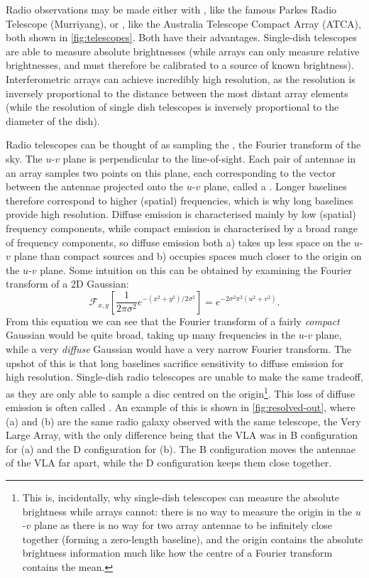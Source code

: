         Radio observations may be made either with , like the famous Parkes Radio Telescope (Murriyang), or , like the Australia Telescope Compact Array (ATCA), both shown in \autoref{fig:telescopes}. Both have their advantages. Single-dish telescopes are able to measure absolute brightnesses (while arrays can only measure relative brightnesses, and must therefore be calibrated to a source of known brightness). Interferometric arrays can achieve incredibly high resolution, as the resolution is inversely proportional to the distance between the most distant array elements (while the resolution of single dish telescopes is inversely proportional to the diameter of the dish).

        Radio telescopes can be thought of as sampling the , the Fourier transform of the sky. The $u$-$v$ plane is perpendicular to the line-of-sight. Each pair of antennae in an array samples two points on this plane, each corresponding to the vector between the antennae projected onto the $u$-$v$ plane, called a . Longer baselines therefore correspond to higher (spatial) frequencies, which is why long baselines provide high resolution. Diffuse emission is characterised mainly by low (spatial) frequency components, while compact emission is characterised by a broad range of frequency components, so diffuse emission both a) takes up less space on the $u$-$v$ plane than compact sources and b) occupies spaces much closer to the origin on the $u$-$v$ plane. Some intuition on this can be obtained by examining the Fourier transform of a 2D Gaussian:
        \begin{equation}
            \mathcal F_{x, y}\left[\frac{1}{2\pi\sigma^2} e^{-(x^2 + y^2) / 2\sigma^2}\right] = e^{-2\sigma^2 \pi^2(u^2 + v^2)}.
        \end{equation}
        From this equation we can see that the Fourier transform of a fairly \emph{compact} Gaussian would be quite broad, taking up many frequencies in the $u$-$v$ plane, while a very \emph{diffuse} Gaussian would have a very narrow Fourier transform. The upshot of this is that long baselines sacrifice sensitivity to diffuse emission for high resolution. Single-dish radio telescopes are unable to make the same tradeoff, as they are only able to sample a disc centred on the origin\footnote{This is, incidentally, why single-dish telescopes can measure the absolute brightness while arrays cannot: there is no way to measure the origin in the $u$-$v$ plane as there is no way for two array antennae to be infinitely close together (forming a zero-length baseline), and the origin contains the absolute brightness information much like how the centre of a Fourier transform contains the mean.}. This loss of diffuse emission is often called . An example of this is shown in \autoref{fig:resolved-out}, where (a) and (b) are the same radio galaxy observed with the same telescope, the Very Large Array, with the only difference being that the VLA was in B configuration for (a) and the D configuration for (b). The B configuration moves the antennae of the VLA far apart, while the D configuration keeps them close together.

